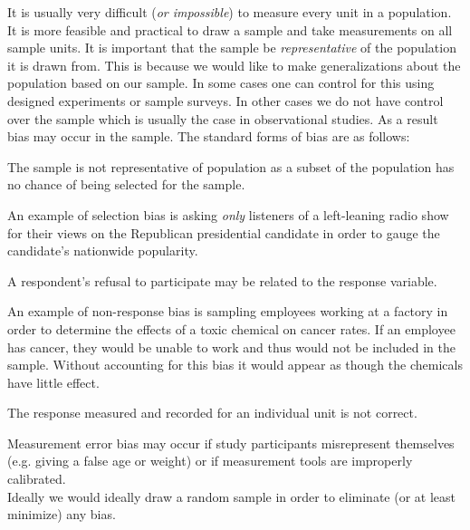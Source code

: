 It is usually very difficult (\textit{or impossible}) to measure every unit in a population. It is more feasible and practical to draw a sample and take measurements on all sample units. It is important that the sample be \textit{representative} of the population it is drawn from. This is because we would like to make generalizations about the population based on our sample. In some cases one can control for this using designed experiments or sample surveys. In other cases we do not have control over the sample which is usually the case in observational studies. As a result bias may occur in the sample.
The standard forms of bias are as follows:

\begin{definition}	
The sample is not representative of population as a
subset of the population has no chance of being selected for the sample.
\end{definition}

\noindent
An example of selection bias is asking \textit{only} listeners of a left-leaning radio show for their views on the Republican presidential candidate in order to gauge the candidate's nationwide popularity.

\begin{definition}		
A respondent's refusal to participate may be related to the response variable.
\end{definition}

An example of non-response bias is sampling employees working at a factory in order to determine the effects of a toxic chemical on cancer rates. If an employee has cancer, they would be unable to work and thus would not be included in the sample. Without accounting for this bias it would appear as though the chemicals have little effect.

\begin{definition}		
The response measured and recorded for an individual unit is not correct.
\end{definition}

\noindent
Measurement error bias may occur if study participants misrepresent themselves (e.g. giving a false age or weight) or if measurement tools are improperly calibrated. \\

Ideally we would ideally draw a random sample in order to eliminate 
(or at least minimize) any bias.

